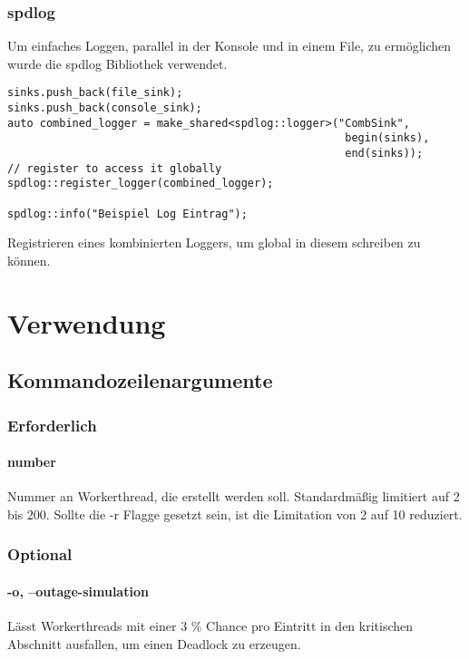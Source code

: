 \documentclass[12pt, letterpaper]{article}
\newenvironment{code}{\captionsetup{type=listing}}{}
\begin{document}
\newpage

\subsubsection{spdlog}
Um einfaches Loggen, parallel in der Konsole und in einem File, zu ermöglichen wurde die spdlog\cite{spdlog_ref} Bibliothek verwendet. 
\begin{code}
\begin{verbatim}
sinks.push_back(file_sink);
sinks.push_back(console_sink);
auto combined_logger = make_shared<spdlog::logger>("CombSink", 
                                                    begin(sinks), 
                                                    end(sinks));
// register to access it globally
spdlog::register_logger(combined_logger);

spdlog::info("Beispiel Log Eintrag");
\end{verbatim}
\caption{Registrieren eines kombinierten Loggers, um global in diesem schreiben zu können.}
\end{code}

\section{Verwendung}
\label{usage}

\subsection{Kommandozeilenargumente}
\subsubsection{Erforderlich}

\paragraph{number}
Nummer an Workerthread, die erstellt werden soll. Standardmäßig limitiert auf 2 bis 200. Sollte die -r Flagge gesetzt sein, ist die Limitation von 2 auf 10 reduziert.

\subsubsection{Optional}
\paragraph{-o, --outage-simulation}
Lässt Workerthreads mit einer 3 \% Chance pro Eintritt in den kritischen Abschnitt ausfallen, um einen Deadlock zu erzeugen. 
\end{document}
